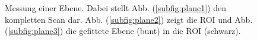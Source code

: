 \documentclass[	12pt,
				a4paper,
				bibliography=totoc,
				listof=totoc,
				index=totoc,
				twoside,
				headsepline,
				footsepline,
				ngerman]{scrartcl}
\begin{document}
\begin{appendix}
		\begin{figure}[h]
			\centering
			\caption[Messung einer Ebene]{Messung einer Ebene. Dabei stellt Abb. (\ref{subfig:plane1}) den kompletten Scan dar. Abb. (\ref{subfig:plane2}) zeigt die ROI und Abb. (\ref{subfig:plane3}) die gefittete Ebene (bunt) in die ROI (schwarz).}
			\label{fig:plane_fit}
		\end{figure}
		

\end{appendix}
\end{document}
